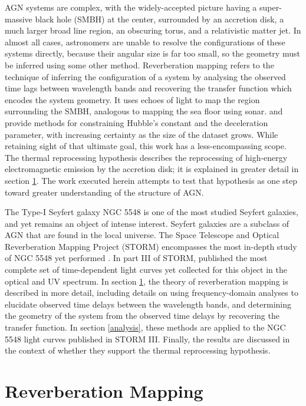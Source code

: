 \documentclass[11pt,letterpaper]{article}
\begin{document}
AGN systems are complex, with the widely-accepted picture having a super-massive black hole (SMBH) at the center, surrounded by an accretion disk, a much larger broad line region, an obscuring torus, and a relativistic matter jet. In almost all cases, astronomers are unable to resolve the configurations of these systems directly, because their angular size is far too small, so the geometry must be inferred using some other method. Reverberation mapping refers to the technique of inferring the configuration of a system by analysing the observed time lags between wavelength bands and recovering the transfer function which encodes the system geometry. It uses echoes of light to map the region surrounding the SMBH, analogous to mapping the sea floor using sonar. \cite{1999MNRAS.302L..24C} and \cite{2007MNRAS.380..669C} provide methods for constraining Hubble's constant and the deceleration parameter, with increasing certainty as the size of the dataset grows. While retaining sight of that ultimate goal, this work has a less-encompassing scope. The thermal reprocessing hypothesis describes the reprocessing of high-energy electromagnetic emission by the accretion disk; it is explained in greater detail in section \ref{sec:reverbmap}. The work executed herein attempts to test that hypothesis as one step toward greater understanding of the structure of AGN.  

The Type-I Seyfert galaxy NGC 5548 is one of the most studied Seyfert galaxies, and yet remains an object of intense interest. Seyfert galaxies are a subclass of AGN that are found in the local universe. The Space Telescope and Optical Reverberation Mapping Project (STORM) encompasses the most in-depth study of NGC 5548 yet performed \citep{2015ApJ...806..128D} \citep{2015ApJ...806..129E} \citep{2016ApJ...821...56F}. In part III of STORM, \cite{2016ApJ...821...56F} published the most complete set of time-dependent light curves yet collected for this object in the optical and UV spectrum. In section \ref{sec:reverbmap}, the theory of reverberation mapping is described in more detail, including details on using frequency-domain analyses to elucidate observed time delays between the wavelength bands, and determining the geometry of the system from the observed time delays by recovering the transfer function. In section \ref{analysis}, these methods are applied to the NGC 5548 light curves published in STORM III. Finally, the results are discussed in the context of whether they support the thermal reprocessing hypothesis.


\section{Reverberation Mapping}
\label{sec:reverbmap}
\end{document}
